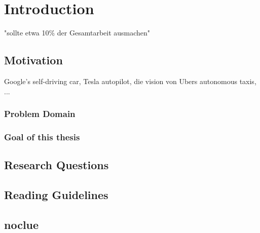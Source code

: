
\chapter{Introduction} %

\label{ch:intro} %


\newcommand{\keyword}[1]{\textit{#1}}
\newcommand{\tabhead}[1]{\textbf{#1}}
\newcommand{\code}[1]{\texttt{#1}}
\newcommand{\file}[1]{\texttt{\bfseries#1}}
\newcommand{\option}[1]{\texttt{\itshape#1}}
\newcommand{\batchnorm}{batch normalization }
\newcommand{\Batchnorm}{Batch normalization }


"sollte etwa 10\% der Gesamtarbeit ausmachen"

\section{Motivation}

Google's self-driving car, Tesla autopilot, die vision von Ubers autonomous taxis, ...

\subsection{Problem Domain}

\subsection{Goal of this thesis}

\section{Research Questions}

\section{Reading Guidelines}


\section{noclue}

